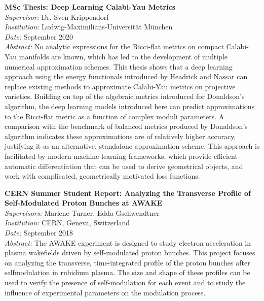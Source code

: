 \documentclass[11pt]{article}
\begin{document}
\textbf{MSc Thesis: Deep Learning Calabi-Yau Metrics}\\
\textit{Supervisor:} Dr. Sven Krippendorf\\
\textit{Institution:} Ludwig-Maximilians-Universität München\\
\textit{Date:} September 2020 \\
\textit{Abstract:} No analytic expressions for the Ricci-flat metrics on compact Calabi-Yau manifolds are known, which has led to the development of multiple numerical approximation schemes. This thesis shows that a deep learning approach using the energy functionals introduced by Headrick and Nassar can replace existing methods to approximate Calabi-Yau metrics on projective varieties. Building on top of the algebraic metrics introduced for Donaldson's algorithm, the deep learning models introduced here can predict approximations to the Ricci-flat metric as a function of complex moduli parameters. A comparison with the benchmark of balanced metrics produced by Donaldson's algorithm indicates these approximations are of relatively higher accuracy, justifying it as an alternative, standalone approximation scheme. This approach is facilitated by modern machine learning frameworks, which provide efficient automatic differentiation that can be used to derive geometrical objects, and work with complicated, geometrically motivated loss functions.


\textbf{CERN Summer Student Report: Analyzing the Transverse Profile of Self-Modulated Proton Bunches at AWAKE}\\
\textit{Supervisors:} Marlene Turner, Edda Gschwendtner\\
\textit{Institution:} CERN, Geneva, Switzerland\\
\textit{Date:} September 2018\\
\textit{Abstract:} The AWAKE experiment is designed to study electron acceleration in plasma wakefields driven by self-modulated proton bunches. This project focuses on analyzing the transverse, time-integrated profile of the proton bunches after selfmodulation in rubidium plasma. The size and shape of these profiles can be used to verify the presence of self-modulation for each event and to study the influence of experimental parameters on the modulation process.
\end{document}
